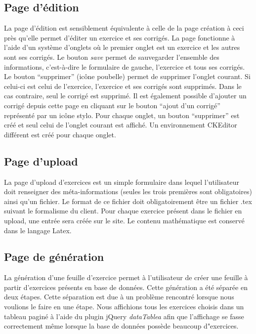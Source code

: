 \subsection{Page d'édition} 

La page d'édition est sensiblement équivalente à celle de la page création à ceci près qu'elle permet d'éditer un exercice et ses corrigés. La page fonctionne à l'aide d'un système d'onglets où le premier onglet est un exercice et les autres sont ses corrigés. Le bouton \emph{save} permet de sauvegarder l'ensemble des informations, c'est-à-dire le formulaire de gauche, l'exercice et tous ses corrigés. Le bouton \enquote{supprimer} (icône poubelle) permet de supprimer l'onglet courant. Si celui-ci est celui de l'exercice, l'exercice et ses corrigés sont supprimés. Dans le cas contraire, seul le corrigé est supprimé. Il est également possible d'ajouter un corrigé depuis cette page en cliquant sur le bouton \enquote{ajout d'un corrigé} représenté par un icône stylo. Pour chaque onglet, un bouton \enquote{supprimer} est créé et seul celui de l'onglet courant est affiché. Un environnement CKEditor différent est créé pour chaque onglet. 

\subsection{Page d'upload}

La page d'upload d'exercices est un simple formulaire dans lequel l'utilisateur doit renseigner des méta-informations (seules les trois premières sont obligatoires) ainsi qu'un fichier. Le format de ce fichier doit obligatoirement être un fichier .tex suivant le formalisme du client. Pour chaque exercice présent dans le fichier en upload, une entrée sera créée sur le site. Le contenu mathématique est conservé dans le langage Latex.

\subsection{Page de génération}

La génération d'une feuille d'exercice permet à l'utilisateur de créer une feuille à partir d'exercices présents en base de données. Cette génération a été séparée en deux étapes. Cette séparation est due à un problème rencontré lorsque nous voulions le faire en une étape. Nous affichions tous les exercices choisis dans un tableau paginé à l'aide du plugin jQuery \emph{dataTablea} afin que l'affichage se fasse correctement même lorsque la base de données possède beaucoup d"exercices.

